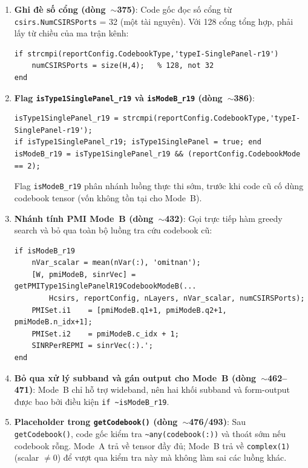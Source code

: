 \documentclass[11pt,a4paper]{article}
\begin{document}
\begin{enumerate}

\item \textbf{Ghi đè số cổng (dòng~$\sim$375)}: Code gốc đọc số cổng từ
\texttt{csirs.NumCSIRSPorts} = 32 (một tài nguyên). Với 128 cổng tổng hợp,
phải lấy từ chiều của ma trận kênh:
\begin{lstlisting}[style=matlab]
if strcmpi(reportConfig.CodebookType,'typeI-SinglePanel-r19')
    numCSIRSPorts = size(H,4);   % 128, not 32
end
\end{lstlisting}

\item \textbf{Flag \texttt{isType1SinglePanel\_r19} và \texttt{isModeB\_r19} (dòng~$\sim$386)}:
\begin{lstlisting}[style=matlab]
isType1SinglePanel_r19 = strcmpi(reportConfig.CodebookType,'typeI-SinglePanel-r19');
if isType1SinglePanel_r19; isType1SinglePanel = true; end
isModeB_r19 = isType1SinglePanel_r19 && (reportConfig.CodebookMode == 2);
\end{lstlisting}
Flag \texttt{isModeB\_r19} phân nhánh luồng thực thi sớm, trước khi code
cũ cố dùng codebook tensor (vốn không tồn tại cho Mode~B).

\item \textbf{Nhánh tính PMI Mode~B (dòng~$\sim$432)}: Gọi trực tiếp hàm
greedy search và bỏ qua toàn bộ luồng tra cứu codebook cũ:
\begin{lstlisting}[style=matlab]
if isModeB_r19
    nVar_scalar = mean(nVar(:), 'omitnan');
    [W, pmiModeB, sinrVec] = getPMIType1SinglePanelR19CodebookModeB(...
        Hcsirs, reportConfig, nLayers, nVar_scalar, numCSIRSPorts);
    PMISet.i1    = [pmiModeB.q1+1, pmiModeB.q2+1, pmiModeB.n_idx+1];
    PMISet.i2    = pmiModeB.c_idx + 1;
    SINRPerREPMI = sinrVec(:).';
end
\end{lstlisting}

\item \textbf{Bỏ qua xử lý subband và gán output cho Mode~B (dòng~$\sim$462--471)}:
Mode~B chỉ hỗ trợ wideband, nên hai khối subband và form-output được bao bởi
điều kiện \texttt{if \textasciitilde isModeB\_r19}.

\item \textbf{Placeholder trong \texttt{getCodebook()} (dòng~$\sim$476/493)}: Sau
\texttt{getCodebook()}, code gốc kiểm tra \texttt{\textasciitilde any(codebook(:))}
và thoát sớm nếu codebook rỗng. Mode~A trả về tensor đầy đủ; Mode~B trả về
\texttt{complex(1)} (scalar $\neq 0$) để vượt qua kiểm tra này mà không làm sai
các luồng khác.

\end{enumerate}
\end{document}
